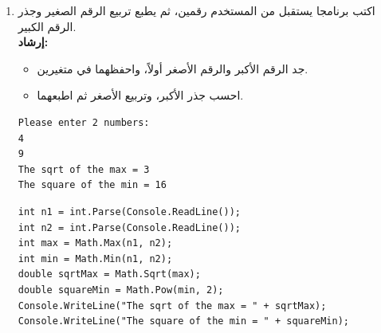 \documentclass[14pt]{extarticle}
\begin{document}
\begin{enumerate}[itemsep=3em]
    \item
    اكتب برنامجا يستقبل من المستخدم رقمين، ثم يطبع تربيع الرقم الصغير وجذر الرقم الكبير. \\
    \textbf{إرشاد:}
    \begin{itemize}[itemsep=0em]
        \item جد الرقم الأكبر والرقم الأصغر أولاً، واحفظهما في متغيرين.
        \item احسب جذر الأكبر، وتربيع الأصغر ثم اطبعهما.
    \end{itemize}
    \ifdetailed
    \begin{boxExample}
    \begin{english}
    \begin{verbatim}
Please enter 2 numbers:
4
9
The sqrt of the max = 3
The square of the min = 16
    \end{verbatim}
    \end{english}
    \end{boxExample}
    \ifwithsols
    \begin{boxSolution}
    \begin{english}
    \begin{verbatim}
int n1 = int.Parse(Console.ReadLine());
int n2 = int.Parse(Console.ReadLine());
int max = Math.Max(n1, n2);
int min = Math.Min(n1, n2);
double sqrtMax = Math.Sqrt(max);
double squareMin = Math.Pow(min, 2);
Console.WriteLine("The sqrt of the max = " + sqrtMax);
Console.WriteLine("The square of the min = " + squareMin);
    \end{verbatim}
    \end{english}
    \end{boxSolution}
    \fi
    \clearpage
\fi


\end{enumerate}
\end{document}
